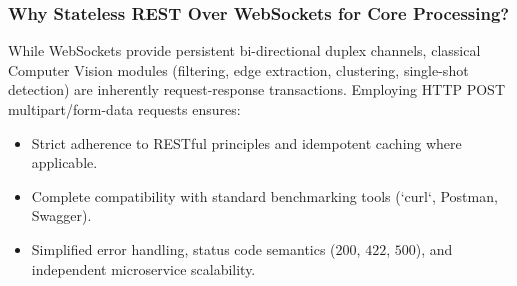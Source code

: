 \subsubsection{Why Stateless REST Over WebSockets for Core Processing?}
While WebSockets provide persistent bi-directional duplex channels, classical Computer Vision modules (filtering, edge extraction, clustering, single-shot detection) are inherently request-response transactions. Employing HTTP POST multipart/form-data requests ensures:
\begin{itemize}
    \item Strict adherence to RESTful principles and idempotent caching where applicable.
    \item Complete compatibility with standard benchmarking tools (`curl`, Postman, Swagger).
    \item Simplified error handling, status code semantics ($200$, $422$, $500$), and independent microservice scalability.
\end{itemize}
